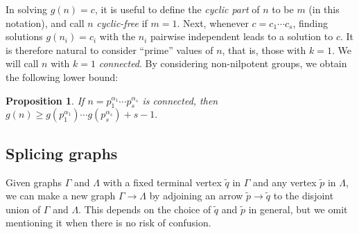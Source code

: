 \documentclass{article}
\newcommand{\ufdsh}{p_1^{\alpha_1} \cdots p_s^{\alpha_s}}
\newcommand{\qo}{\tilde{q}}
\newcommand{\pin}{\tilde{p}}
\theoremstyle{plain}
\newtheorem{prop}{Proposition}[section]
\theoremstyle{definition}
\begin{document}
In solving $g(n) = c$, it is useful to define the \emph{cyclic part} of $n$ to be $m$ (in this notation), and call $n$ \emph{cyclic-free} if $m = 1$. Next, whenever $c = c_1 \cdots c_s$, finding solutions $g(n_i) = c_i$ with the $n_i$ pairwise independent leads to a solution to $c$. It is therefore natural to consider ``prime'' values of $n$, that is, those with $k = 1$. We will call $n$ with $k = 1$ \emph{connected}. By considering non-nilpotent groups, we obtain the following lower bound:

\begin{prop}
	If $n = \ufdsh$ is connected, then $g(n) \ge g(p_1^{\alpha_1})\cdots g(p_s^{\alpha_s}) + s - 1.$
\end{prop}

\subsection{Splicing graphs}
Given graphs $\Gamma$ and $\Lambda$ with a fixed terminal vertex $\qo$ in $\Gamma$ and any vertex $\pin$ in $\Lambda$, we can make a new graph $\Gamma \rightarrow \Lambda$ by adjoining an arrow $\pin \rightarrow \qo$ to the disjoint union of $\Gamma$ and $\Lambda$. This depends on the choice of $\qo$ and $\pin$ in general, but we omit mentioning it when there is no risk of confusion.
\end{document}
